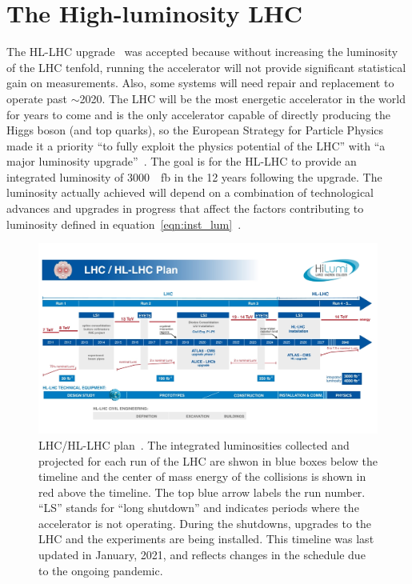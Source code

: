 \section{The High-luminosity LHC}

The HL-LHC upgrade~\cite{hl_lhc_tdr} was accepted because without increasing the luminosity of the LHC tenfold, running the accelerator will not provide significant statistical gain on measurements. Also, some systems will need repair and replacement to operate past $\sim$2020. The LHC will be the most energetic accelerator in the world for years to come and is the only accelerator capable of directly producing the Higgs boson (and top quarks), so the European Strategy for Particle Physics made it a priority ``to fully exploit the physics potential of the LHC'' with ``a major luminosity upgrade''~\cite{european_strategy_for_particle_physics}. The goal is for the HL-LHC to provide an integrated luminosity of \SI{3000}{\per\femto\barn} in the 12 years following the upgrade. The luminosity actually achieved will depend on a combination of technological advances and upgrades in progress that affect the factors contributing to luminosity defined in equation~\ref{eqn:inst_lum}~\cite{hl_lhc_tdr}.

\begin{figure}
    \centering
    \includegraphics[width = \textwidth]{figures/HL-LHC-updated-January-2021_small.jpg}
    \caption{LHC/HL-LHC plan~\cite{hl-lhc_plan_picture_website}. The integrated luminosities collected and projected for each run of the LHC are shwon in blue boxes below the timeline and the center of mass energy of the collisions is shown in red above the timeline. The top blue arrow labels the run number. ``LS'' stands for ``long shutdown'' and indicates periods where the accelerator is not operating. During the shutdowns, upgrades to the LHC and the experiments are being installed. This timeline was last updated in January, 2021, and reflects changes in the schedule due to the ongoing pandemic. }
    \label{fig:hl-lhc}
\end{figure}


